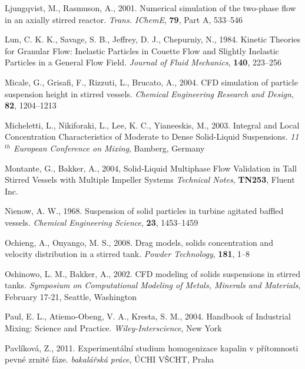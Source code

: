 \begin{thebibliography}{99}
 Ljungqvist, M., Rasmuson, A., 2001. Numerical simulation of the two-phase flow in an axially stirred reactor. \textit{Trans. IChemE}, \textbf{79}, Part A, 533--546

 Lun, C. K. K., Savage, S. B., Jeffrey, D. J., Chepurniy, N., 1984. Kinetic Theories for Granular Flow: Inelastic Particles in Couette Flow and Slightly Inelastic Particles in a General Flow Field. \textit{Journal of Fluid Mechanics}, \textbf{140}, 223--256 

 Micale, G., Grisafi, F., Rizzuti, L., Brucato, A., 2004. CFD simulation of particle suspension height in stirred vessels. \textit{Chemical Engineering Research and Design}, \textbf{82}, 1204--1213

 Micheletti, L., Nikiforaki, L., Lee, K. C., Yianeeskis, M., 2003. Integral and Local Concentration Characteristics of Moderate to Dense Solid-Liquid Suspensions. \textit{11$^{th}$ European Conference on Mixing}, Bamberg, Germany

 Montante, G., Bakker, A., 2004, Solid-Liquid Multiphase Flow Validation in Tall Stirred Vessels with Multiple Impeller Systems \textit{Technical Notes}, \textbf{TN253}, Fluent Inc.

 Nienow, A. W., 1968. Suspension of solid particles in turbine agitated baffled vessels. \textit{Chemical Engineering Science}, \textbf{23}, 1453--1459 

 Ochieng, A., Onyango, M. S., 2008. Drag models, solids concentration and velocity distribution in a stirred tank. \textit{Powder Technology}, \textbf{181}, 1--8

 Oshinowo, L. M., Bakker, A., 2002. CFD modeling of solids suspensions in stirred tanks. \textit{Symposium on Computational Modeling of Metals, Minerals and Materials}, February 17-21, Seattle, Washington 

 Paul, E. L., Atiemo-Obeng, V. A., Kresta, S. M., 2004. Handbook of Industrial Mixing: Science and Practice. \textit{Wiley-Interscience}, New York

 Pavlíková, Z., 2011. Experimentální studium homogenizace kapalin v přítomnosti pevné zrnité fáze. \textit{bakalářská práce}, ÚCHI VŠCHT, Praha 


\end{thebibliography}
